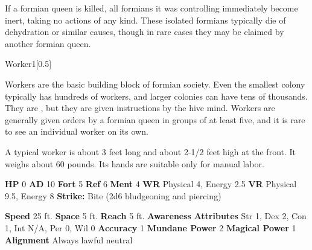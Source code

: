     If a formian queen is killed, all formians it was controlling immediately become inert, taking no actions of any kind.
    These isolated formians typically die of dehydration or similar causes, though in rare cases they may be claimed by another formian queen.
  

      

      
  \begin{monsubsection}{Worker}{1}[0.5]
    \vspace{-1em}\vspace{-1em}
    \vspace{0em}

    
        Workers are the basic building block of formian society.
        Even the smallest colony typically has hundreds of workers, and larger colonies can have tens of thousands.
        They are , but they are given instructions by the hive mind.
        Workers are generally given orders by a formian queen in groups of at least five, and it is rare to see an individual worker on its own.

        A typical worker is about 3 feet long and about 2-1/2 feet high at the front.
        It weighs about 60 pounds.
        Its hands are suitable only for manual labor.
      
    

    \begin{spellcontent}
      \begin{spelltargetinginfo}
        \pari \textbf{HP} 0 \monsep
          \textbf{AD} 10 \monsep
          \textbf{Fort} 5 \monsep
          \textbf{Ref} 6 \monsep
          \textbf{Ment} 4
        \pari \textbf{WR} Physical 4, Energy 2.5 \monsep
        \textbf{VR} Physical 9.5, Energy 8
        \pari \textbf{Strike:}
            Bite  (2d6 bludgeoning and piercing)
      \end{spelltargetinginfo}
    \end{spellcontent}
    \begin{monsterfooter}
      \pari \textbf{Speed} 25 ft. \monsep
        \textbf{Space} 5 ft. \monsep
        \textbf{Reach} 5 ft.
      \pari \textbf{Awareness} 
      \pari \textbf{Attributes}
        Str 1, Dex 2,
        Con 1, Int N/A,
        Per 0, Wil 0
      \pari \textbf{Accuracy} 1 \monsep
        \textbf{Mundane Power} 2 \monsep
      \textbf{Magical Power} 1
      \pari \textbf{Alignment} Always lawful neutral
    \end{monsterfooter}
  \end{monsubsection}
